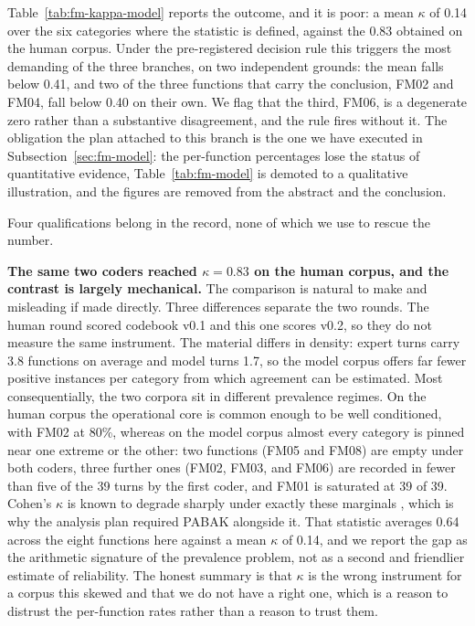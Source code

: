 \documentclass{sbc2023}%
\begin{document}
Table~\ref{tab:fm-kappa-model} reports the outcome, and it is poor: a mean $\kappa$ of 0.14 over the six categories where the statistic is defined, against the 0.83 obtained on the human corpus. Under the pre-registered decision rule this triggers the most demanding of the three branches, on two independent grounds: the mean falls below 0.41, and two of the three functions that carry the conclusion, FM02 and FM04, fall below 0.40 on their own. We flag that the third, FM06, is a degenerate zero rather than a substantive disagreement, and the rule fires without it. The obligation the plan attached to this branch is the one we have executed in Subsection~\ref{sec:fm-model}: the per-function percentages lose the status of quantitative evidence, Table~\ref{tab:fm-model} is demoted to a qualitative illustration, and the figures are removed from the abstract and the conclusion.

Four qualifications belong in the record, none of which we use to rescue the number.

\textbf{The same two coders reached $\kappa = 0.83$ on the human corpus, and the contrast is largely mechanical.} The comparison is natural to make and misleading if made directly. Three differences separate the two rounds. The human round scored codebook v0.1 and this one scores v0.2, so they do not measure the same instrument. The material differs in density: expert turns carry 3.8 functions on average and model turns 1.7, so the model corpus offers far fewer positive instances per category from which agreement can be estimated. Most consequentially, the two corpora sit in different prevalence regimes. On the human corpus the operational core is common enough to be well conditioned, with FM02 at 80\%, whereas on the model corpus almost every category is pinned near one extreme or the other: two functions (FM05 and FM08) are empty under both coders, three further ones (FM02, FM03, and FM06) are recorded in fewer than five of the 39 turns by the first coder, and FM01 is saturated at 39 of 39. Cohen's $\kappa$ is known to degrade sharply under exactly these marginals \citep{feinstein1990high}, which is why the analysis plan required PABAK alongside it. That statistic averages 0.64 across the eight functions here against a mean $\kappa$ of 0.14, and we report the gap as the arithmetic signature of the prevalence problem, not as a second and friendlier estimate of reliability. The honest summary is that $\kappa$ is the wrong instrument for a corpus this skewed and that we do not have a right one, which is a reason to distrust the per-function rates rather than a reason to trust them.
\end{document}
